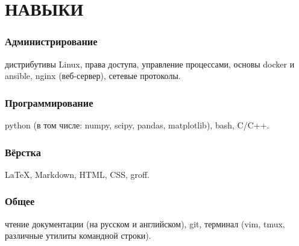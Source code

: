 \section{НАВЫКИ}

    \subsubsection{Администрирование}
    дистрибутивы Linux, права доступа, управление процессами, основы docker и ansible, nginx (веб-сервер),
    сетевые протоколы.
    
    \subsubsection{Программирование}
    python (в том числе: numpy, scipy, pandas, matplotlib), bash, C/C++.
    
    \subsubsection{Вёрстка}
    \LaTeX, Markdown, HTML, CSS, groff.

    \subsubsection{Общее}
    чтение документации (на русском и английском), git, терминал (vim, tmux, различные утилиты командной строки).
    
    \vspace{.7em}

